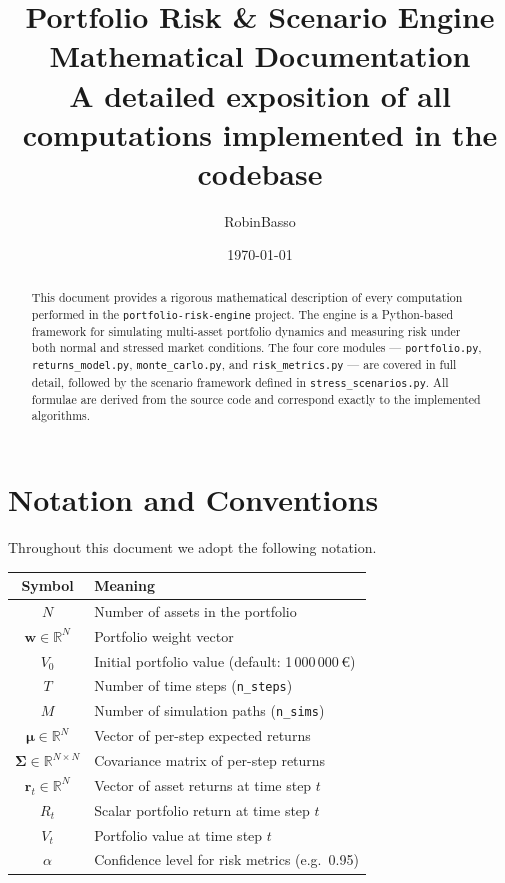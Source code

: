 \documentclass[12pt, a4paper]{article}
\title{
    \vspace{-1cm}
    \textbf{\Large Portfolio Risk \& Scenario Engine} \\[0.4em]
    \large Mathematical Documentation \\[0.2em]
    \normalsize A detailed exposition of all computations implemented in the codebase
}
\author{RobinBasso}
\date{\today}
\begin{document}

\maketitle
\thispagestyle{fancy}

\begin{abstract}
This document provides a rigorous mathematical description of every computation
performed in the \texttt{portfolio-risk-engine} project. The engine is a
Python-based framework for simulating multi-asset portfolio dynamics and
measuring risk under both normal and stressed market conditions. The four core
modules --- \texttt{portfolio.py}, \texttt{returns\_model.py},
\texttt{monte\_carlo.py}, and \texttt{risk\_metrics.py} --- are covered in full
detail, followed by the scenario framework defined in \texttt{stress\_scenarios.py}.
All formulae are derived from the source code and correspond exactly to the
implemented algorithms.
\end{abstract}

\tableofcontents
\newpage

\section{Notation and Conventions}

Throughout this document we adopt the following notation.

\begin{center}
\begin{tabular}{cl}
\toprule
\textbf{Symbol} & \textbf{Meaning} \\
\midrule
$N$ & Number of assets in the portfolio \\
$\bm{w} \in \mathbb{R}^N$ & Portfolio weight vector \\
$V_0$ & Initial portfolio value (default: 1\,000\,000\,€) \\
$T$ & Number of time steps (\texttt{n\_steps}) \\
$M$ & Number of simulation paths (\texttt{n\_sims}) \\
$\bm{\mu} \in \mathbb{R}^N$ & Vector of per-step expected returns \\
$\bm{\Sigma} \in \mathbb{R}^{N \times N}$ & Covariance matrix of per-step returns \\
$\bm{r}_t \in \mathbb{R}^N$ & Vector of asset returns at time step $t$ \\
$R_t$ & Scalar portfolio return at time step $t$ \\
$V_t$ & Portfolio value at time step $t$ \\
$\alpha$ & Confidence level for risk metrics (e.g.\ 0.95) \\
\bottomrule
\end{tabular}
\end{center}
\end{document}
